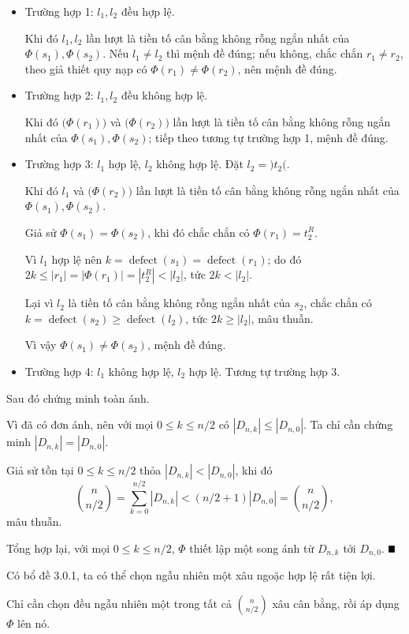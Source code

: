 \documentclass[11pt]{article}
\providecommand{\square}{\mathord{\vcenter{\hrule height .6em width .6em}}}
\begin{document}
\begin{itemize}
  \item Trường hợp 1: $l_1,l_2$ đều hợp lệ.

  Khi đó $l_1,l_2$ lần lượt là tiền tố cân bằng không rỗng ngắn nhất của
  $\Phi(s_1),\Phi(s_2)$. Nếu $l_1\ne l_2$ thì mệnh đề đúng; nếu không, chắc chắn
  $r_1\ne r_2$, theo giả thiết quy nạp có $\Phi(r_1)\ne \Phi(r_2)$, nên mệnh đề
  đúng.
  \item Trường hợp 2: $l_1,l_2$ đều không hợp lệ.

  Khi đó $\texttt{(}\Phi(r_1)\texttt{)}$ và $\texttt{(}\Phi(r_2)\texttt{)}$ lần
  lượt là tiền tố cân bằng không rỗng ngắn nhất của $\Phi(s_1),\Phi(s_2)$; tiếp
  theo tương tự trường hợp 1, mệnh đề đúng.
  \item Trường hợp 3: $l_1$ hợp lệ, $l_2$ không hợp lệ. Đặt
  $l_2=\texttt{)}t_2\texttt{(}$.

  Khi đó $l_1$ và $\texttt{(}\Phi(r_2)\texttt{)}$ lần lượt là tiền tố cân bằng
  không rỗng ngắn nhất của $\Phi(s_1),\Phi(s_2)$.

  Giả sử $\Phi(s_1)=\Phi(s_2)$, khi đó chắc chắn có $\Phi(r_1)=t_2^R$.

  Vì $l_1$ hợp lệ nên
  $k=\operatorname{defect}(s_1)=\operatorname{defect}(r_1)$; do đó
  $2k\le |r_1|=|\Phi(r_1)|=|t_2^R|<|l_2|$, tức $2k<|l_2|$.

  Lại vì $l_2$ là tiền tố cân bằng không rỗng ngắn nhất của $s_2$, chắc chắn có
  $k=\operatorname{defect}(s_2)\ge \operatorname{defect}(l_2)$, tức
  $2k\ge |l_2|$, mâu thuẫn.

  Vì vậy $\Phi(s_1)\ne \Phi(s_2)$, mệnh đề đúng.
  \item Trường hợp 4: $l_1$ không hợp lệ, $l_2$ hợp lệ. Tương tự trường hợp 3.
\end{itemize}

Sau đó chứng minh toàn ánh.

Vì đã có đơn ánh, nên với mọi $0\le k\le n/2$ có $|D_{n,k}|\le |D_{n,0}|$. Ta
chỉ cần chứng minh $|D_{n,k}|=|D_{n,0}|$.

Giả sử tồn tại $0\le k\le n/2$ thỏa $|D_{n,k}|<|D_{n,0}|$, khi đó
\[
\binom{n}{n/2}
=\sum_{k=0}^{n/2}|D_{n,k}|
<(n/2+1)|D_{n,0}|
=\binom{n}{n/2},
\]
mâu thuẫn.

Tổng hợp lại, với mọi $0\le k\le n/2$, $\Phi$ thiết lập một song ánh từ
$D_{n,k}$ tới $D_{n,0}$. \hfill$\square$

Có bổ đề 3.0.1, ta có thể chọn ngẫu nhiên một xâu ngoặc hợp lệ rất tiện lợi.

Chỉ cần chọn đều ngẫu nhiên một trong tất cả $\binom{n}{n/2}$ xâu cân bằng, rồi
áp dụng $\Phi$ lên nó.
\end{document}
